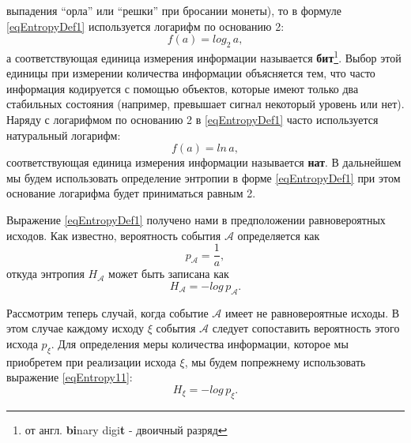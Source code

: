 выпадения ``орла'' или ``решки'' при бросании монеты), то в формуле
\eqref{eqEntropyDef1} используется логарифм по основанию 2:
\begin{equation}
f\left(a\right) = log_2\,a,
\label{eqEntropyDefBit}
\end{equation}
а соответствующая единица измерения информации называется {\bf бит}\footnote{от
англ. {\bf{bi}}nary digi{\bf{t}} - двоичный разряд}. Выбор этой
единицы при измерении количества информации
объясняется тем, что часто информация кодируется с помощью объектов,
которые имеют только два стабильных состояния (например, превышает
сигнал некоторый уровень или нет). Наряду с логарифмом по основанию 2 в \eqref{eqEntropyDef1}
часто используется натуральный логарифм:
\begin{equation}
f\left(a\right) = ln\,a,
\label{eqEntropyDefNat}
\end{equation}
соответствующая единица измерения информации называется {\bf нат}. В
дальнейшем мы будем использовать определение энтропии в форме
\eqref{eqEntropyDef1} при этом основание логарифма будет приниматься
равным 2.

Выражение \eqref{eqEntropyDef1} получено нами в предположении
равновероятных исходов. Как известно, вероятность события
$\mathcal{A}$ определяется как
\[
p_{\mathcal{A}} = \frac{1}{a},
\]
откуда энтропия $H_{\mathcal{A}}$ может быть записана как
\begin{equation}
H_{\mathcal{A}} = -log \, p_{\mathcal{A}}.
\label{eqEntropy11}
\end{equation}

Рассмотрим теперь случай, когда событие $\mathcal{A}$ имеет не
равновероятные исходы. В этом случае каждому исходу $\xi$ события
$\mathcal{A}$ следует сопоставить вероятность этого исхода
$p_{\xi}$. Для определения меры количества информации, которое мы
приобретем при реализации исхода $\xi$, мы будем попрежнему
использовать выражение \eqref{eqEntropy11}:
\begin{equation}
H_{\xi} = -log \, p_{\xi}.
\label{eqEntropy12}
\end{equation}

